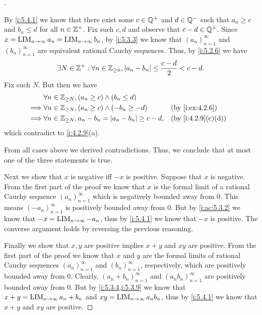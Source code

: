 \begin{proof}[]
\begin{itemize}
          By \cref{i:5.4.1} we know that there exist some \(c \in \mathbb{Q}^+\) and \(d \in \mathbb{Q}^-\) such that \(a_n \geq c\) and \(b_n \leq d\) for all \(n \in \mathbb{Z}^+\).
          Fix such \(c, d\) and observe that \(c - d \in \mathbb{Q}^+\).
          Since \(x = \operatorname*{LIM}_{n \to \infty} a_n = \operatorname*{LIM}_{n \to \infty} b_n\), by \cref{i:5.3.3} we know that \((a_n)_{n = 1}^\infty\) and \((b_n)_{n = 1}^\infty\) are equivalent rational Cauchy sequences.
          Thus, by \cref{i:5.2.6} we have
          \[
            \exists N \in \mathbb{Z}^+ : \forall n \in \mathbb{Z}_{\geq n}, \left\lvert a_n - b_n\right\rvert \leq \dfrac{c - d}{2} < c - d.
          \]
          Fix such \(N\).
          But then we have
          \begin{align*}
                     & \forall n \in \Z_{\geq N}, (a_n \geq c) \land (b_n \leq d)                                \\
            \implies & \forall n \in \Z_{\geq N}, (a_n \geq c) \land (-b_n \geq -d)       &  & \by{i:ex:4.2.6}   \\
            \implies & \forall n \in \Z_{\geq N}, a_n - b_n = \abs{a_n - b_n} \geq c - d, &  & \by{i:4.2.9}[c,d]
          \end{align*}
          which contradict to \cref{i:4.2.9}(a).
  \end{itemize}
  From all cases above we derived contradictions.
  Thus, we conclude that at most one of the three statements is true.

  Next we show that \(x\) is negative iff \(-x\) is positive.
  Suppose that \(x\) is negative.
  From the first part of the proof we know that \(x\) is the formal limit of a rational Cauchy sequence \((a_n)_{n = 1}^\infty\) which is negatively bounded away from \(0\).
  This means \((-a_n)_{n = 1}^\infty\) is positively bounded away from \(0\).
  But by \cref{i:ac:5.3.2} we know that \(-x = \operatorname*{LIM}_{n \to \infty} -a_n\), thus by \cref{i:5.4.1} we know that \(-x\) is positive.
  The converse argument holds by reversing the previous reasoning.

  Finally we show that \(x, y\) are positive implies \(x + y\) and \(xy\) are positive.
  From the first part of the proof we know that \(x\) and \(y\) are the formal limits of rational Cauchy sequences \((a_n)_{n = 1}^\infty\) and \((b_n)_{n = 1}^\infty\), respectively, which are positively bounded away from \(0\).
  Clearly, \((a_n + b_n)_{n = 1}^\infty\) and \((a_n b_n)_{n = 1}^\infty\) are positively bounded away from \(0\).
  But by \cref{i:5.3.4,i:5.3.9} we know that \(x + y = \operatorname*{LIM}_{n \to \infty} a_n + b_n\) and \(xy = \operatorname*{LIM}_{n \to \infty} a_n b_n\), thus by \cref{i:5.4.1} we know that \(x + y\) and \(xy\) are positive.
\end{proof}

